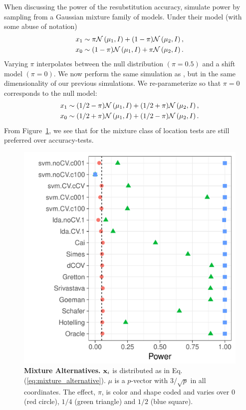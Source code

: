 \documentclass[oupdraft]{bio}
\begin{document}
When discussing the power of the resubstitution accuracy, \cite{golland_permutation_2005} simulate power by sampling from a Gaussian mixture family of models. 
Under their model (with some abuse of notation)
\begin{align*}
\begin{split}
x_1 & \sim \pi \mathcal{N}\left(\mu_1,I\right)+ (1-\pi) \mathcal{N}\left(\mu_2,I\right), \\
x_0 & \sim (1-\pi) \mathcal{N}\left(\mu_1,I\right)+ \pi \mathcal{N}\left(\mu_2,I\right).
\end{split}
\end{align*}
Varying $\pi$ interpolates between the null distribution $(\pi=0.5)$ and a shift model $(\pi=0)$. 
We now perform the same simulation as \cite{golland_permutation_2005}, but in the same dimensionality of our previous simulations.
We re-parameterize so that $\pi=0$ corresponds to the null model:
\begin{align}
\begin{split}
\label{eq:mixture_alternative}
x_1 & \sim (1/2-\pi) \mathcal{N}\left(\mu_1,I\right)+ (1/2+\pi) \mathcal{N}\left(\mu_2,I\right), \\
x_0 & \sim (1/2+\pi) \mathcal{N}\left(\mu_1,I\right)+ (1/2-\pi) \mathcal{N}\left(\mu_2,I\right).	
\end{split}
\end{align}
From Figure~\ref{fig:file12}, we see that for the mixture class of \cite{golland_permutation_2005} location tests are still preferred over accuracy-tests. 


\begin{figure}[h]
	\centering
	\includegraphics[width=0.5\columnwidth]{"file12"}
	\caption{\textbf{Mixture Alternatives.} $\mathbf{x}_i$ is distributed as in Eq.(\ref{eq:mixture_alternative}). 
		$\mu$ is a $p$-vector with $3/\sqrt{p}$ in all coordinates.
		The effect, $\pi$, is color and shape coded and varies over $0$ (red circle), $1/4$ (green triangle) and $1/2$ (blue square). }
	\label{fig:file12}
\end{figure}
\end{document}
